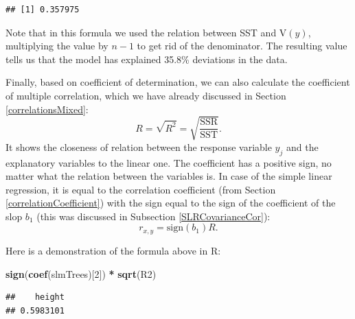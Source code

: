 \documentclass[
]{book}
\newenvironment{Shaded}{\begin{snugshade}}{\end{snugshade}}
\newcommand{\DecValTok}[1]{\textcolor[rgb]{0.00,0.00,0.81}{#1}}
\newcommand{\FunctionTok}[1]{\textcolor[rgb]{0.13,0.29,0.53}{\textbf{#1}}}
\newcommand{\NormalTok}[1]{#1}
\newcommand{\SpecialCharTok}[1]{\textcolor[rgb]{0.81,0.36,0.00}{\textbf{#1}}}
\theoremstyle{definition}
\theoremstyle{definition}
\theoremstyle{definition}
\theoremstyle{definition}
\theoremstyle{remark}
\begin{document}
\begin{verbatim}
## [1] 0.357975
\end{verbatim}

Note that in this formula we used the relation between SST and V\((y)\), multiplying the value by \(n-1\) to get rid of the denominator. The resulting value tells us that the model has explained 35.8\% deviations in the data.

Finally, based on coefficient of determination, we can also calculate the coefficient of multiple correlation, which we have already discussed in Section \ref{correlationsMixed}:
\begin{equation}
    R = \sqrt{R^2} = \sqrt{\frac{\mathrm{SSR}}{\mathrm{SST}}} .
    \label{eq:multipleCorrelation}
\end{equation}
It shows the closeness of relation between the response variable \(y_j\) and the explanatory variables to the linear one. The coefficient has a positive sign, no matter what the relation between the variables is. In case of the simple linear regression, it is equal to the correlation coefficient (from Section \ref{correlationCoefficient}) with the sign equal to the sign of the coefficient of the slop \(b_1\) (this was discussed in Subsection \ref{SLRCovarianceCor}):
\begin{equation}
    r_{x,y} = \mathrm{sign} (b_1) R .
    \label{eq:correlationInRegression}
\end{equation}

Here is a demonstration of the formula above in R:

\begin{Shaded}
\begin{Highlighting}[]
\FunctionTok{sign}\NormalTok{(}\FunctionTok{coef}\NormalTok{(slmTrees)[}\DecValTok{2}\NormalTok{]) }\SpecialCharTok{*} \FunctionTok{sqrt}\NormalTok{(R2)}
\end{Highlighting}
\end{Shaded}

\begin{verbatim}
##    height 
## 0.5983101
\end{verbatim}

\begin{Shaded}
\end{Shaded}
\end{document}
